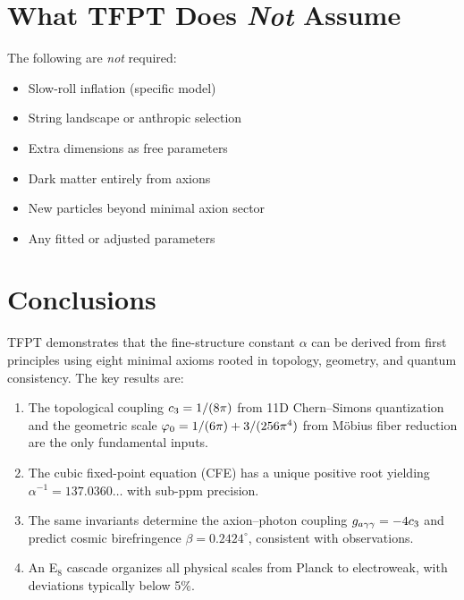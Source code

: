 \section{What TFPT Does \emph{Not} Assume}

The following are \emph{not} required:
\begin{itemize}[leftmargin=2em]
    \item[\ding{55}] Slow-roll inflation (specific model)
    \item[\ding{55}] String landscape or anthropic selection
    \item[\ding{55}] Extra dimensions as free parameters
    \item[\ding{55}] Dark matter entirely from axions
    \item[\ding{55}] New particles beyond minimal axion sector
    \item[\ding{55}] Any fitted or adjusted parameters
\end{itemize}

\section{Conclusions}

TFPT demonstrates that the fine-structure constant $\alpha$ can be derived 
from first principles using eight minimal axioms rooted in topology, geometry, 
and quantum consistency. The key results are:

\begin{enumerate}
    \item The topological coupling $c_3 = 1/(8\pi)$ from 11D Chern--Simons 
        quantization and the geometric scale $\varphi_0 = 1/(6\pi) + 3/(256\pi^4)$ 
        from M\"obius fiber reduction are the only fundamental inputs.
    
    \item The cubic fixed-point equation (CFE) has a unique positive root 
        yielding $\alpha^{-1} = 137.0360\ldots$ with sub-ppm precision.
    
    \item The same invariants determine the axion--photon coupling 
        $g_{a\gamma\gamma} = -4c_3$ and predict cosmic birefringence 
        $\beta = 0.2424^\circ$, consistent with observations.
    
    \item An E$_8$ cascade organizes all physical scales from Planck to 
        electroweak, with deviations typically below 5\%.
\end{enumerate}

